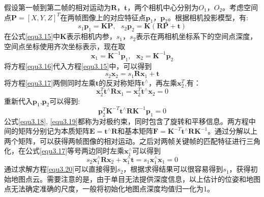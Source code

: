 假设第一帧到第二帧的相对运动为$\boldsymbol{R}$，$\boldsymbol{t}$，两个相机中心分别为$O_1$，$O_2$。考虑空间点$\boldsymbol{P}=[X,Y,Z]^T$在两帧图像上的对应特征点$\boldsymbol{p}_1$，$\boldsymbol{p}_2$。根据相机投影模型，有:
\begin{equation}
\label{equ3.15}
s_1 \boldsymbol{p}_1 = \boldsymbol{K} \boldsymbol{P}, \ \ \ 
s_2 \boldsymbol{p}_2 = \boldsymbol{K} (\boldsymbol{R} \boldsymbol{P}+\boldsymbol{t})
\end{equation}
在公式\eqref{equ3.15}中$\boldsymbol{K}$表示相机内参，$s_1$，$s_2$表示在两相机坐标系下的空间点深度，空间点坐标使用齐次坐标表示，现在取
\begin{equation}
\label{equ3.16}
\boldsymbol{x}_1 = \boldsymbol{K}^{-1} \boldsymbol{p}_1, \ \ \ 
\boldsymbol{x}_2 = \boldsymbol{K}^{-1} \boldsymbol{p}_2
\end{equation}
将方程\eqref{equ3.16}代入方程\eqref{equ3.15}中，可以得到
\begin{equation}
\label{equ3.17}
s_2 \boldsymbol{x}_2 = s_1 \boldsymbol{R} \boldsymbol{x}_1 + \boldsymbol{t}
\end{equation}
将方程\eqref{equ3.17}两侧同时左乘$\boldsymbol{t}$的反对称矩阵$\boldsymbol{t}^{\wedge}$，再左乘$\boldsymbol{x}_2^T$,有：
\begin{equation}
\label{equ3.18}
\boldsymbol{x}_2^T  \boldsymbol{t}^{\wedge}  \boldsymbol{R} \boldsymbol{x}_1 = \boldsymbol{x}_2^T \boldsymbol{t}^{\wedge} \boldsymbol{x}_2 = 0
\end{equation}
重新代入$\boldsymbol{p}_1$,$\boldsymbol{p}_2$可以得到:
\begin{equation}
\label{equ3.19}
\boldsymbol{p}_2^T \boldsymbol{K}^{-T} \boldsymbol{t}^{\wedge}  \boldsymbol{R} \boldsymbol{K}^{-1} \boldsymbol{p}_1  = 0
\end{equation}
公式\eqref{equ3.18}, \eqref{equ3.19}都称为对极约束，同时包含了旋转和平移信息。两方程中间的矩阵分别记为本质矩阵$\boldsymbol{E} = \boldsymbol{t}^{\wedge}  \boldsymbol{R} $和基本矩阵$\boldsymbol{F} = \boldsymbol{K}^{-T} \boldsymbol{t}^{\wedge}  \boldsymbol{R} \boldsymbol{K}^{-1}$。通过分解以上两个矩阵，可以获得两帧图像的相对运动。之后对两帧关键帧的匹配特征进行三角化，在公式\eqref{equ3.17}等号两边同时左乘$\boldsymbol{x}_1^{\wedge}$可以得到
\begin{equation}
\label{equ3.20}
s_2 \boldsymbol{x}_1^{\wedge} \boldsymbol{R} \boldsymbol{x}_2 + \boldsymbol{x}_1^{\wedge} \boldsymbol{t} = s_1 \boldsymbol{x}_1^{\wedge} \boldsymbol{x}_1 = 0
\end{equation}
通过求解方程\eqref{equ3.20}可以直接得到$s_2$，根据求得结果可以很容易得到$s_1$，获得初始地图点云。需要注意的是，由于单目无法提供深度信息，以上估计的位姿和地图点无法确定准确的尺度，一般将初始化地图点深度均值归一化为1。

